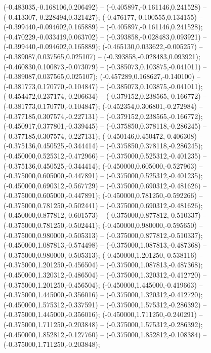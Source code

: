  (-0.483035,-0.168106,0.206492) -- (-0.405897,-0.161146,0.241528) -- (-0.413307,-0.228494,0.321427);
 (-0.476177,-0.100555,0.134155) -- (-0.399440,-0.094602,0.165889) -- (-0.405897,-0.161146,0.241528);
 (-0.470229,-0.033419,0.063702) -- (-0.393858,-0.028483,0.093921) -- (-0.399440,-0.094602,0.165889);
 (-0.465130,0.033622,-0.005257) -- (-0.389087,0.037565,0.025107) -- (-0.393858,-0.028483,0.093921);
 (-0.460830,0.100873,-0.073079) -- (-0.385073,0.103875,-0.041011) -- (-0.389087,0.037565,0.025107);
 (-0.457289,0.168627,-0.140100) -- (-0.381773,0.170770,-0.104847) -- (-0.385073,0.103875,-0.041011);
 (-0.454472,0.237174,-0.206634) -- (-0.379152,0.238565,-0.166772) -- (-0.381773,0.170770,-0.104847);
 (-0.452354,0.306801,-0.272984) -- (-0.377185,0.307574,-0.227131) -- (-0.379152,0.238565,-0.166772);
 (-0.450917,0.377801,-0.339445) -- (-0.375850,0.378118,-0.286245) -- (-0.377185,0.307574,-0.227131);
 (-0.450146,0.450472,-0.406308) -- (-0.375136,0.450525,-0.344414) -- (-0.375850,0.378118,-0.286245);
 (-0.450000,0.525312,-0.472966) -- (-0.375000,0.525312,-0.401235) -- (-0.375136,0.450525,-0.344414);
 (-0.450000,0.605000,-0.527963) -- (-0.375000,0.605000,-0.447891) -- (-0.375000,0.525312,-0.401235);
 (-0.450000,0.690312,-0.567729) -- (-0.375000,0.690312,-0.481626) -- (-0.375000,0.605000,-0.447891);
 (-0.450000,0.781250,-0.592266) -- (-0.375000,0.781250,-0.502441) -- (-0.375000,0.690312,-0.481626);
 (-0.450000,0.877812,-0.601573) -- (-0.375000,0.877812,-0.510337) -- (-0.375000,0.781250,-0.502441);
 (-0.450000,0.980000,-0.595650) -- (-0.375000,0.980000,-0.505313) -- (-0.375000,0.877812,-0.510337);
 (-0.450000,1.087813,-0.574498) -- (-0.375000,1.087813,-0.487368) -- (-0.375000,0.980000,-0.505313);
 (-0.450000,1.201250,-0.538116) -- (-0.375000,1.201250,-0.456504) -- (-0.375000,1.087813,-0.487368);
 (-0.450000,1.320312,-0.486504) -- (-0.375000,1.320312,-0.412720) -- (-0.375000,1.201250,-0.456504);
 (-0.450000,1.445000,-0.419663) -- (-0.375000,1.445000,-0.356016) -- (-0.375000,1.320312,-0.412720);
 (-0.450000,1.575312,-0.337591) -- (-0.375000,1.575312,-0.286392) -- (-0.375000,1.445000,-0.356016);
 (-0.450000,1.711250,-0.240291) -- (-0.375000,1.711250,-0.203848) -- (-0.375000,1.575312,-0.286392);
 (-0.450000,1.852812,-0.127760) -- (-0.375000,1.852812,-0.108384) -- (-0.375000,1.711250,-0.203848);
